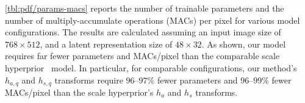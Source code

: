 \cref{tbl:pdf/params-macs} reports the number of trainable parameters and the number of multiply-accumulate operations (MACs) per pixel for various model configurations.
The results are calculated assuming an input image size of $768 \times 512$, and a latent representation size of $48 \times 32$.
As shown, our model requires far fewer parameters and MACs/pixel than the comparable scale hyperprior~\cite{balle2018variational} model.
In particular, for comparable configurations, our method's $h_{a,q}$ and $h_{s,q}$ transforms require $96\text{--}97\%$ fewer parameters and $96\text{--}99\%$ fewer MACs/pixel than the scale hyperprior's $h_{a}$ and $h_{s}$ transforms.


